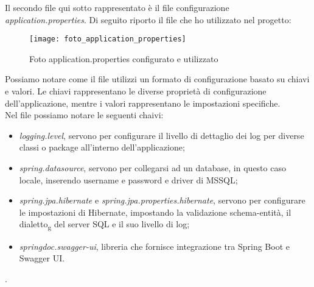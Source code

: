 \noindent Il secondo file qui sotto rappresentato è il file configurazione \textit{application.properties}. Di seguito riporto il file che ho utilizzato nel progetto:
\begin{figure}[H] 
    \centering 
    \texttt{[image: foto\_application\_properties]} 
    \caption{Foto application.properties configurato e utilizzato}
\end{figure}
%
%
%
%
%
Possiamo notare come il file utilizzi un formato di configurazione basato su chiavi e valori. Le chiavi rappresentano le diverse proprietà di configurazione dell'applicazione, mentre i valori rappresentano le impostazioni specifiche.\\
Nel file possiamo notare le seguenti chaivi:
\begin{itemize}
\item \textit{logging.level}, servono per configurare il livello di dettaglio dei log per diverse classi o package all'interno dell'applicazione;
\item \textit{spring.datasource}, servono per collegarsi ad un database, in questo caso locale, inserendo username e password e driver di MSSQL;
\item \textit{spring.jpa.hibernate} e \textit{spring.jpa.properties.hibernate}, servono per configurare le impostazioni di Hibernate, impostando la validazione schema-entità, il dialetto\textsubscript{g} del server SQL e il suo livello di log;
\item \textit{springdoc.swagger-ui}, libreria che fornisce integrazione tra Spring Boot e Swagger UI.  
\end{itemize}. 
